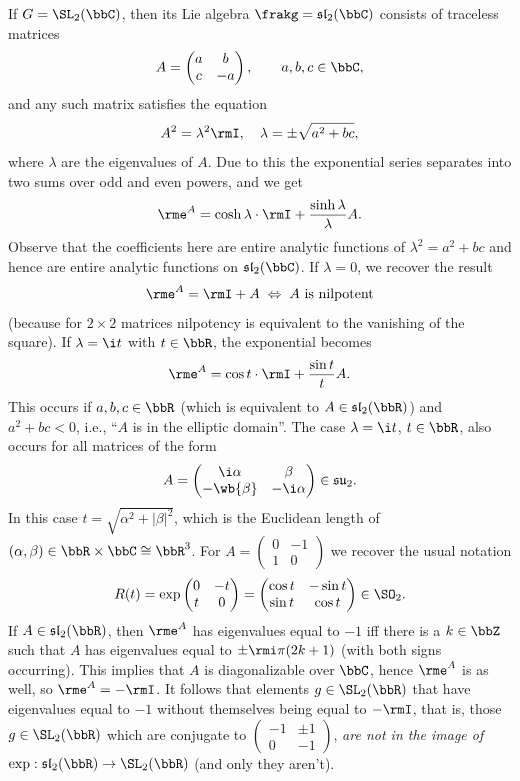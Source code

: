 \begin{example}
If $G=\SL_2(\bbC)$, then its Lie algebra $\frakg=\mathfrak{sl}_2(\bbC)$ consists of traceless matrices
\[A=\begin{pmatrix}
    a&b\\c&-a
\end{pmatrix},\quad \quad a,b,c\in\bbC,\]
and any such matrix satisfies the equation
\[A^2=\lambda^2 \rmI,\quad \lambda=\pm \sqrt{a^2+bc},\]
where $\lambda$ are the eigenvalues of $A$. Due to this the exponential series separates into two sums over odd and even powers, and we get
\[\rme^A=\cosh \lambda \cdot \rmI+\frac{\sinh \lambda}{\lambda}A.\]
Observe that the coefficients here are entire analytic functions of $\lambda^2=a^2+bc$ and hence are entire analytic functions on $\mathfrak{sl}_2(\bbC)$. If $\lambda=0$, we recover the result
\[\rme^A=\rmI+A \; \Leftrightarrow \; A\text{ is nilpotent}\]
(because for $2\times 2$ matrices nilpotency is equivalent to the vanishing of the square). If $\lambda=\i t$ with $t\in \bbR$, the exponential becomes
\[\rme^A=\cos t\cdot \rmI+\frac{\sin t}{t}A.\]
This occurs if $a,b,c\in\bbR$ (which is equivalent to $A\in\mathfrak{sl}_2(\bbR)$) and $a^2+bc<0$, i.e., ``$A$ is in the elliptic domain''. The case $\lambda=\i t$, $t\in\bbR$, also occurs for all matrices of the form
\[A=\begin{pmatrix}
    \i\alpha&\beta\\-\wb{\beta}&-\i\alpha
\end{pmatrix}\in\mathfrak{su}_2.\]
In this case $t=\sqrt{\alpha^2+|\beta|^2}$, which is the Euclidean length of $(\alpha,\beta)\in\bbR\times\bbC\cong \bbR^3$. For $A=\begin{pmatrix}
    0&-1\\1&0
\end{pmatrix}$ we recover the usual notation
\[R(t)=\exp \begin{pmatrix}
    0&-t\\t&0
\end{pmatrix}=\begin{pmatrix}
    \cos t&-\sin t\\\sin t&\cos t
\end{pmatrix}\in\SO_2.\]
If $A\in\mathfrak{sl}_2(\bbR)$, then $\rme^A$ has eigenvalues equal to $-1$ iff there is a $k\in\bbZ$ such that $A$ has eigenvalues equal to $\pm\rmi \pi(2k+1)$ (with both signs occurring). This implies that $A$ is diagonalizable over $\bbC$, hence $\rme^A$ is as well, so $\rme^A=-\rmI$. It follows that elements $g\in\SL_2(\bbR)$ that have eigenvalues equal to $-1$ without themselves being equal to $-\rmI$, that is, those $g\in\SL_2(\bbR)$ which are conjugate to $\left(\begin{smallmatrix}
    -1&\pm 1\\0&-1
\end{smallmatrix}\right)$, \emph{are not in the image of $\exp:\mathfrak{sl}_2(\bbR)\to \SL_2(\bbR)$} (and only they aren't).


\end{example}

